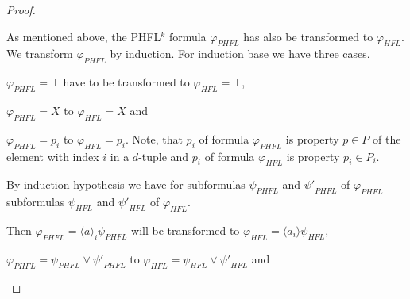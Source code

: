 \begin{proof}
\begin{center}
        \end{center}

    As mentioned above, the PHFL$^k$ formula $\varphi_{PHFL}$ has also be transformed to $\varphi_{HFL}$. We
    transform $\varphi_{PHFL}$ by induction. For induction base we have three cases.
    \begin{compactitem}
        \item $\varphi_{PHFL} = \top$ have to be transformed to $\varphi_{HFL} = \top$,

        \item $\varphi_{PHFL} = X$ to $\varphi_{HFL} = X$ and

        \item $\varphi_{PHFL} = p_i$ to $\varphi_{HFL} = p_i$. Note, that $p_i$ of formula $\varphi_{PHFL}$ is
        property $p \in P$ of the element with index $i$ in a $d$-tuple and $p_i$ of formula $\varphi_{HFL}$ is
        property $p_i \in P_i$.
    \end{compactitem}
    By induction hypothesis we have for subformulas $\psi_{PHFL}$ and ${\psi'}_{PHFL}$ of $\varphi_{PHFL}$ subformulas
    $\psi_{HFL}$ and ${\psi'}_{HFL}$ of $\varphi_{HFL}$.
    \begin{compactitem}
        \item Then $\varphi_{PHFL} = \langle a \rangle_i \psi_{PHFL}$ will be transformed to $\varphi_{HFL} =
        \langle a_i \rangle \psi_{HFL}$,

        \item $\varphi_{PHFL} = \psi_{PHFL} \vee {\psi'}_{PHFL}$ to $\varphi_{HFL} =
        \psi_{HFL} \vee {\psi'}_{HFL}$ and


\end{compactitem}
\end{proof}
